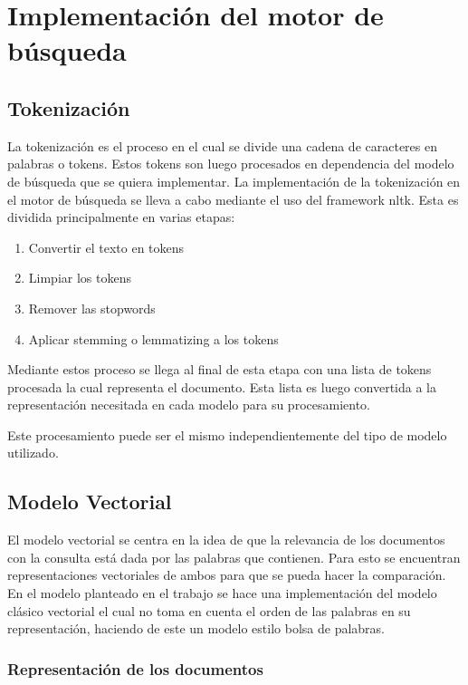 \documentclass[runningheads]{llncs}
\begin{document}
\section{Implementación del motor de búsqueda}

\subsection{Tokenización}

La tokenización es el proceso en el cual se divide una cadena de caracteres en palabras o tokens.
Estos tokens son luego procesados en dependencia del modelo de búsqueda que se quiera implementar.
La implementación de la tokenización en el motor de búsqueda se lleva a cabo mediante el uso del
framework nltk. Esta es dividida principalmente en varias etapas:

\begin{enumerate}
    \item Convertir el texto en tokens
    \item Limpiar los tokens
    \item Remover las stopwords
    \item Aplicar stemming o lemmatizing a los tokens
\end{enumerate}

Mediante estos proceso se llega al final de esta etapa con una lista de tokens procesada la cual
representa el documento. Esta lista es luego convertida a la representación necesitada en cada modelo
para su procesamiento.

Este procesamiento puede ser el mismo independientemente del tipo de modelo utilizado.

\subsection{Modelo Vectorial}

El modelo vectorial se centra en la idea de que la relevancia de los documentos con la consulta está 
dada por las palabras que contienen. Para esto se encuentran representaciones vectoriales de ambos
para que se pueda hacer la comparación. En el modelo planteado en el trabajo se hace una implementación
del modelo clásico vectorial el cual no toma en cuenta el orden de las palabras en su representación, haciendo
de este un modelo estilo bolsa de palabras.

\subsubsection{Representación de los documentos}
\end{document}
